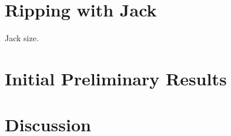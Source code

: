 \documentclass[preprint,10pt,nonatbib]{sigplanconf}
\begin{document}
\section{Ripping with Jack}
\label{section:jack}

Jack size.

% 

\section{Initial Preliminary Results}
\label{section:initial}


\section{Discussion}
\label{section:zz}

\balance
\small

\end{document}
